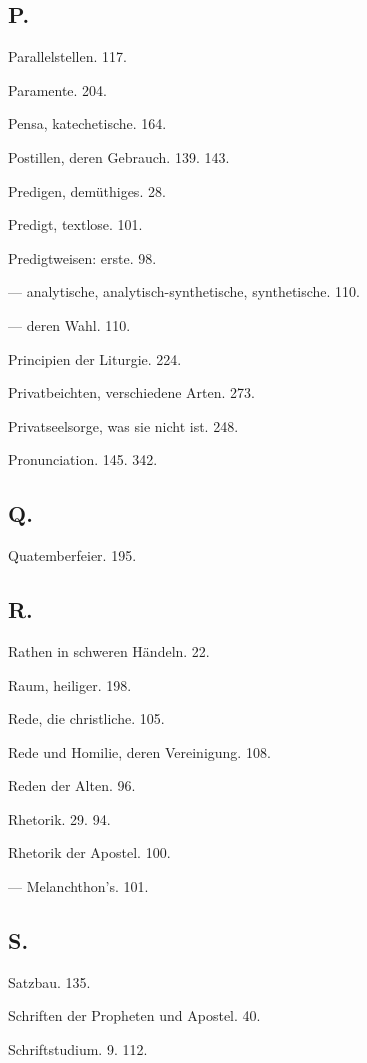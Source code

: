 \subsection*{P.}

Parallelstellen. 117.

Paramente. 204.

Pensa, katechetische. 164.

Postillen, deren Gebrauch. 139. 143.

Predigen, demüthiges. 28.

Predigt, textlose. 101.

Predigtweisen: erste. 98.

— analytische, analytisch-synthetische, synthetische. 110.

— deren Wahl. 110.

Principien der Liturgie. 224.

Privatbeichten, verschiedene Arten. 273.

Privatseelsorge, was sie nicht ist. 248.

Pronunciation. 145. 342.

\subsection*{Q.}

Quatemberfeier. 195.

\subsection*{R.}

Rathen in schweren Händeln. 22.

Raum, heiliger. 198.

Rede, die christliche. 105.

Rede und Homilie, deren Vereinigung. 108.

Reden der Alten. 96.

Rhetorik. 29. 94.

Rhetorik der Apostel. 100.

— Melanchthon’s. 101.

\subsection*{S.}

Satzbau. 135.

Schriften der Propheten und Apostel. 40.

Schriftstudium. 9. 112.

